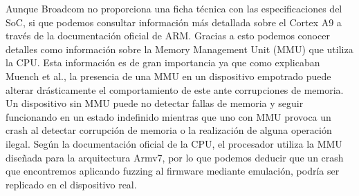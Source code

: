 Aunque Broadcom no proporciona una ficha técnica con las especificaciones del SoC, 
si que podemos consultar información más detallada sobre el Cortex A9 a través de la documentación oficial de ARM\cite{cortexA9}. Gracias a esto podemos 
conocer detalles como información sobre la Memory Management Unit (MMU) que utiliza la CPU. Esta información es de gran importancia ya que como explicaban
Muench et al.\cite{Muench2018}, la presencia de una MMU en un dispositivo empotrado puede alterar drásticamente el comportamiento de este ante corrupciones de 
memoria. Un dispositivo sin MMU puede no detectar fallas de memoria y seguir funcionando en un estado indefinido mientras que uno con MMU provoca un 
crash al detectar corrupción de memoria o la realización de alguna operación ilegal. Según la documentación oficial de la CPU, el procesador utiliza la MMU 
diseñada para la arquitectura Armv7, por lo que podemos deducir que un crash que encontremos aplicando fuzzing al firmware mediante emulación, podría ser replicado
en el dispositivo real.

